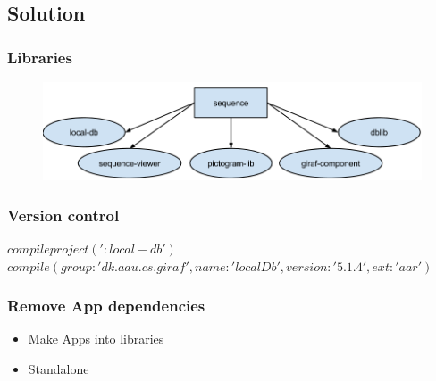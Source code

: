 \subsection{Solution}
\begin{frame}
	\frametitle{Libraries}
	\begin{figure}[H]
			\centering
			\includegraphics[width= 0.8 \textwidth]{pictures/newbuild.png}
	\end{figure}
\end{frame}
\begin{frame}
	\frametitle{Version control}
	$compile project(':local-db')$
	$compile(group: 'dk.aau.cs.giraf', name: 'localDb', version: '5.1.4', ext: 'aar')$
\end{frame}
\begin{frame}
	\frametitle{Remove App dependencies}
	\begin{itemize}
		\item Make Apps into libraries
		\item Standalone			
	\end{itemize}
\end{frame}
